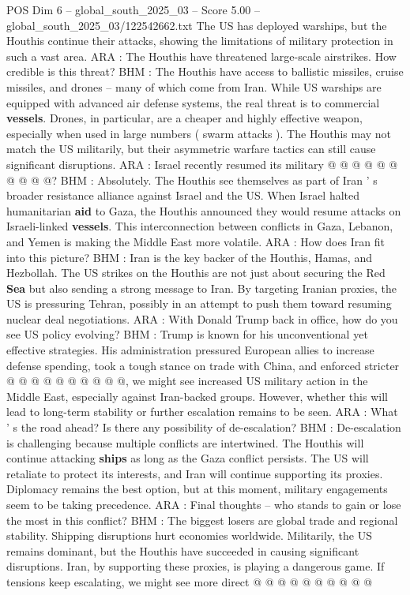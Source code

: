 \begin{textsample}{POS Dim 6 – global\_south\_2025\_03 – Score 5.00 – global\_south\_2025\_03/122542662.txt}
The US has deployed warships, but the Houthis continue their attacks, showing the limitations of military protection in such a vast area.
ARA : The Houthis have threatened large-scale airstrikes.
How credible is this threat?
BHM : The Houthis have access to ballistic missiles, cruise missiles, and drones -- many of which come from Iran.
While US warships are equipped with advanced air defense systems, the real threat is to commercial \textbf{vessels}.
Drones, in particular, are a cheaper and highly effective weapon, especially when used in large numbers ( swarm attacks ).
The Houthis may not match the US militarily, but their asymmetric warfare tactics can still cause significant disruptions.
ARA : Israel recently resumed its military @ @ @ @ @ @ @ @ @ @?
BHM : Absolutely.
The Houthis see themselves as part of Iran ' s broader resistance alliance against Israel and the US.
When Israel halted humanitarian \textbf{aid} to Gaza, the Houthis announced they would resume attacks on Israeli-linked \textbf{vessels}.
This interconnection between conflicts in Gaza, Lebanon, and Yemen is making the Middle East more volatile.
ARA : How does Iran fit into this picture?
BHM : Iran is the key backer of the Houthis, Hamas, and Hezbollah.
The US strikes on the Houthis are not just about securing the Red \textbf{Sea} but also sending a strong message to Iran.
By targeting Iranian proxies, the US is pressuring Tehran, possibly in an attempt to push them toward resuming nuclear deal negotiations.
ARA : With Donald Trump back in office, how do you see US policy evolving?
BHM : Trump is known for his unconventional yet effective strategies.
His administration pressured European allies to increase defense spending, took a tough stance on trade with China, and enforced stricter @ @ @ @ @ @ @ @ @ @, we might see increased US military action in the Middle East, especially against Iran-backed groups.
However, whether this will lead to long-term stability or further escalation remains to be seen.
ARA : What ' s the road ahead?
Is there any possibility of de-escalation?
BHM : De-escalation is challenging because multiple conflicts are intertwined.
The Houthis will continue attacking \textbf{ships} as long as the Gaza conflict persists.
The US will retaliate to protect its interests, and Iran will continue supporting its proxies.
Diplomacy remains the best option, but at this moment, military engagements seem to be taking precedence.
ARA : Final thoughts -- who stands to gain or lose the most in this conflict?
BHM : The biggest losers are global trade and regional stability.
Shipping disruptions hurt economies worldwide.
Militarily, the US remains dominant, but the Houthis have succeeded in causing significant disruptions.
Iran, by supporting these proxies, is playing a dangerous game.
If tensions keep escalating, we might see more direct @ @ @ @ @ @ @ @ @ @

\end{textsample}
